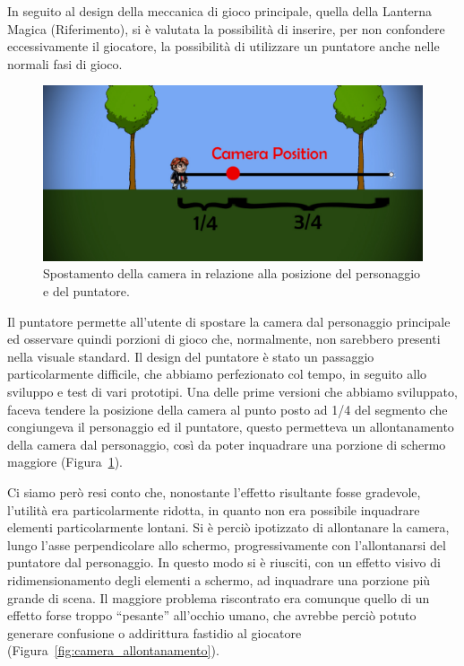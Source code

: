 In seguito al design della meccanica di gioco principale, quella della Lanterna Magica (Riferimento), si è valutata la possibilità di inserire, per non confondere eccessivamente il giocatore, la possibilità di utilizzare un puntatore anche nelle normali fasi di gioco.

\begin{figure}%
	\centering
	\includegraphics[width= 0.85\columnwidth]{images/gameDesign/15.jpg}
	\caption{Spostamento della camera in relazione alla posizione del personaggio e del puntatore.}
	\label{fig:camera_posizione_1_4}
\end{figure}

Il puntatore permette all’utente di spostare la camera dal personaggio principale ed osservare quindi porzioni di gioco che, normalmente, non sarebbero presenti nella visuale standard.
Il design del puntatore è stato un passaggio particolarmente difficile, che abbiamo perfezionato col tempo, in seguito allo sviluppo e test di vari prototipi.
Una delle prime versioni che abbiamo sviluppato, faceva tendere la posizione della camera al punto posto ad 1/4 del segmento che congiungeva il personaggio ed il puntatore, questo permetteva un allontanamento della camera dal personaggio, così da poter inquadrare una porzione di schermo maggiore (Figura~\ref{fig:camera_posizione_1_4}).

Ci siamo però resi conto che, nonostante l’effetto risultante fosse gradevole, l’utilità era particolarmente ridotta, in quanto non era possibile inquadrare elementi particolarmente lontani.
Si è perciò ipotizzato di allontanare la camera, lungo l’asse perpendicolare allo schermo, progressivamente con l’allontanarsi del puntatore dal personaggio.
In questo modo si è riusciti, con un effetto visivo di ridimensionamento degli elementi a schermo, ad inquadrare una porzione più grande di scena. Il maggiore problema riscontrato era comunque quello di un effetto forse troppo “pesante” all’occhio umano, che avrebbe perciò potuto generare confusione o addirittura fastidio al giocatore (Figura~\ref{fig:camera_allontanamento}).

